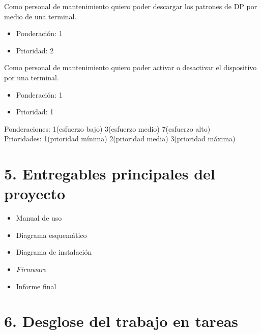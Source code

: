 \documentclass[11pt]{charter}
\begin{document}
Como personal de mantenimiento quiero poder descargar los patrones de DP por medio de una terminal.
\begin{itemize}
\item Ponderación: 1
\item Prioridad: 2
\end{itemize}

Como personal de mantenimiento quiero poder activar o desactivar el dispositivo por una terminal.
\begin{itemize}
\item Ponderación: 1
\item Prioridad: 1
\end{itemize}


Ponderaciones: 1(esfuerzo bajo) 3(esfuerzo medio) 7(esfuerzo alto) \\
Prioridades: 1(prioridad mínima) 2(prioridad media) 3(prioridad máxima)

\section{5. Entregables principales del proyecto}
\label{sec:entregables}

\begin{itemize}
\item Manual de uso
\item Diagrama esquemático
\item Diagrama de instalación
\item \textit{Firmware}
\item Informe final

\end{itemize}

\section{6. Desglose del trabajo en tareas}
\label{sec:wbs}
\end{document}
